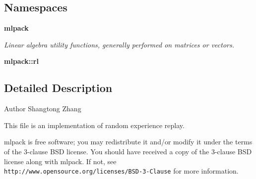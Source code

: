 \subsection*{Namespaces}
\begin{DoxyCompactItemize}
\item 
 \textbf{ mlpack}
\begin{DoxyCompactList}\small\item\em Linear algebra utility functions, generally performed on matrices or vectors. \end{DoxyCompactList}\item 
 \textbf{ mlpack\+::rl}
\end{DoxyCompactItemize}


\subsection{Detailed Description}
\begin{DoxyAuthor}{Author}
Shangtong Zhang
\end{DoxyAuthor}
This file is an implementation of random experience replay.

mlpack is free software; you may redistribute it and/or modify it under the terms of the 3-\/clause B\+SD license. You should have received a copy of the 3-\/clause B\+SD license along with mlpack. If not, see {\tt http\+://www.\+opensource.\+org/licenses/\+B\+S\+D-\/3-\/\+Clause} for more information. 